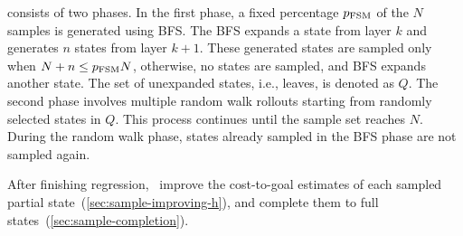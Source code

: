 \documentclass[ppgc,diss,english]{iiufrgs}
\begin{document}
\bfsrw consists of two phases. In the first phase, a fixed percentage $p_\text{FSM}$ of the $N$ samples is generated using BFS. The BFS expands a state from layer $k$ and generates $n$ states from layer $k+1$. These generated states are sampled only when $N + n \leq p_{\text{FSM}}N$, otherwise, no states are sampled, and BFS expands another state. The set of unexpanded states, i.e., leaves, is denoted as $Q$. The second phase involves multiple random walk rollouts starting from randomly selected states in $Q$. This process continues until the sample set reaches $N$. During the random walk phase, states already sampled in the BFS phase are not sampled again.

After finishing regression,~\citet{Bettker.etal/2022} improve the cost-to-goal estimates of each sampled partial state~(\cref{sec:sample-improving-h}), and complete them to full states~(\cref{sec:sample-completion}).

%
\end{document}
